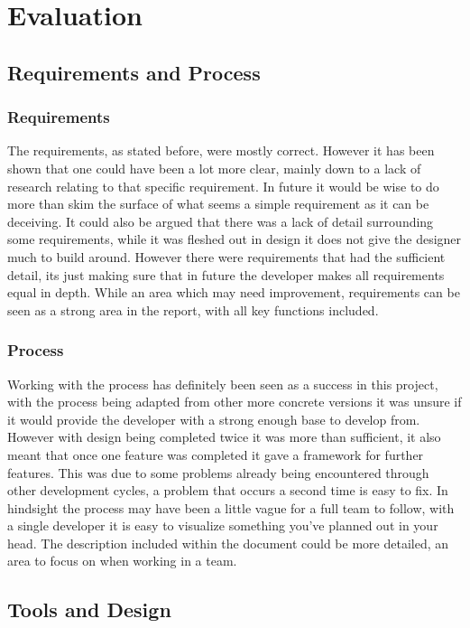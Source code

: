\chapter{Evaluation}


\section{Requirements and Process}
\subsection{Requirements}
The requirements, as stated before, were mostly correct. However it has been shown that one could have been a lot more clear, mainly down to a lack of research relating to that specific requirement. In future it would be wise to do more than skim the surface of what seems a simple requirement as it can be deceiving.  It could also be argued that there was a lack of detail surrounding some requirements, while it was fleshed out in design it does not give the designer much to build around. However there were requirements that had the sufficient detail, its just making sure that in future the developer makes all requirements equal in depth. While an area which may need improvement, requirements can be seen as a strong area in the report, with all key functions included.
\subsection{Process}
Working with the process has definitely been seen as a success in this project, with the process being adapted from other more concrete versions it was unsure if it would provide the developer with a strong enough base to develop from. However with design being completed twice it was more than sufficient, it also meant that once one feature was completed it gave a framework for further features. This was due to some problems already being encountered through other development cycles, a problem that occurs a second time is easy to fix. In hindsight the process may have been a little vague for a full team to follow, with a single developer it is easy to visualize something you've planned out in your head. The description included within the document could be more detailed, an area to focus on when working in a team. 
\section{Tools and Design}
